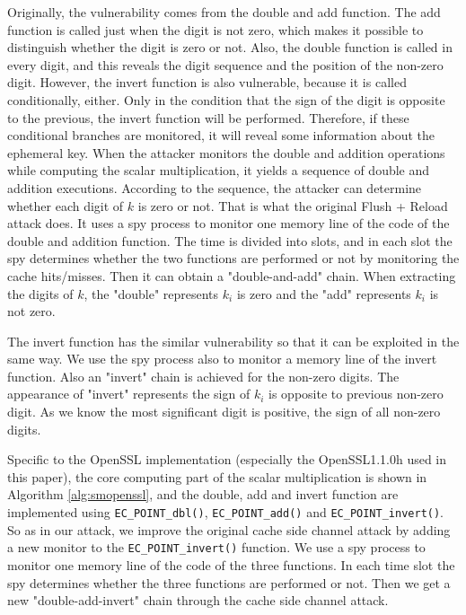 Originally, the vulnerability comes from the double and add function.
The add function is called just when the digit is not zero,
  which makes it possible to distinguish whether the digit is zero or not.
Also, the double function is called in every digit, and this reveals the digit sequence and the position of the non-zero digit.
However,
 the invert function is also vulnerable, because it is called conditionally, either.
Only in the condition that the sign of the digit is opposite to the previous, the invert function will be performed.
Therefore, if these conditional branches are monitored, it will reveal some information about the ephemeral key. 
When the attacker monitors the double and addition operations while computing the scalar multiplication,
it yields a sequence of double and addition executions.
According to the sequence, the attacker can determine whether each digit of $k$ is zero or not.
  That is what the original Flush + Reload attack does. 
It uses a spy process to monitor one memory line of the code of the double and addition function.
 The time is divided into slots, and in each slot 
  the spy determines whether the two functions are performed or not by monitoring the cache hits/misses.
 Then it can obtain a "double-and-add" chain.
  When extracting the digits of $k$, the "double" represents $k_i$ is zero and  
the "add" represents $k_i$ is not zero.

The invert function has the similar vulnerability so that it can be exploited in the same way.
We use the spy process also to monitor a memory line of the invert function.
Also an "invert" chain is achieved for the non-zero digits. 
The appearance of "invert" represents the sign of $k_i$ is opposite to previous non-zero digit. 
As we know the most significant digit is positive, the sign of all non-zero digits.

Specific to the OpenSSL implementation (especially the OpenSSL1.1.0h used in this paper), the core computing part of the scalar multiplication is shown in Algorithm  \ref{alg:smopenssl}, and the double, add and invert function are implemented using  \verb+EC_POINT_dbl()+, \verb+EC_POINT_add()+ and \verb+EC_POINT_invert()+.
So as in our attack, we improve the original cache side channel attack by adding a new monitor to the \verb+EC_POINT_invert()+ function.
We use a spy process to monitor one memory line of the code of the three functions.
 In each time slot 
  the spy determines whether the three functions are performed or not.
Then we get a new "double-add-invert" chain through the cache side channel attack.


